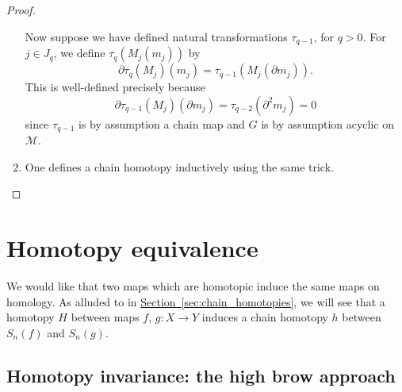 \documentclass[main.tex]{subfiles}
\begin{document}
\begin{proof}
\begin{enumerate}
      Now suppose we have defined natural transformations $\tau_{q-1}$, for $q > 0$. For $j \in J_{q}$, we define $\tau_{q}(M_{j}(m_{j}))$ by
      \begin{equation*}
        \partial \tau_{q}(M_{j})(m_{j}) = \tau_{q-1}(M_{j}(\partial m_{j})).
      \end{equation*}
      This is well-defined precisely because
      \begin{equation*}
        \partial \tau_{q-1}(M_{j})(\partial m_{j}) = \tau_{q-2}(\partial^{2} m_{j}) = 0
      \end{equation*}
      since $\tau_{q-1}$ is by assumption a chain map and $G$ is by assumption acyclic on $\mathcal{M}$.

    \item One defines a chain homotopy inductively using the same trick.
  \end{enumerate} 
\end{proof}

\section{Homotopy equivalence}
\label{sec:homotopy_equivalence}

We would like that two maps which are homotopic induce the same maps on homology. As alluded to in \hyperref[sec:chain_homotopies]{Section~\ref*{sec:chain_homotopies}}, we will see that a homotopy $H$ between maps $f$, $g\colon X \to Y$ induces a chain homotopy $h$ between $S_{n}(f)$ and $S_{n}(g)$.

\subsection{Homotopy invariance: the high brow approach}
\label{ssc:homotopy_invariance_the_high_brow_approach}
\end{document}
